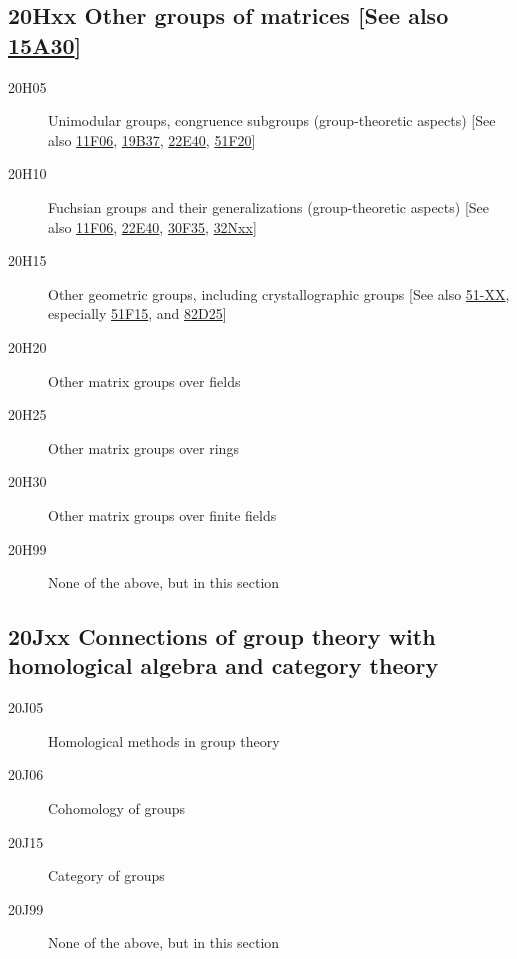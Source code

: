 \documentclass[letterpaper]{article}
\begin{document}
\subsection*{20Hxx  Other groups of matrices [See also \hyperref[15A30]{15A30}] }\label{20Hxx}
\begin{description}  
\item [20H05]\label{20H05} Unimodular groups, congruence subgroups (group-theoretic aspects) [See also \hyperref[11F06]{11F06}, \hyperref[19B37]{19B37}, \hyperref[22E40]{22E40}, \hyperref[51F20]{51F20}]
\item [20H10]\label{20H10} Fuchsian groups and their generalizations (group-theoretic aspects) [See also \hyperref[11F06]{11F06}, \hyperref[22E40]{22E40}, \hyperref[30F35]{30F35}, \hyperref[32Nxx]{32Nxx}]
\item [20H15]\label{20H15} Other geometric groups, including crystallographic groups [See also \hyperref[51-XX]{51-XX}, especially  \hyperref[51F15]{51F15}, and \hyperref[82D25]{82D25}]
\item [20H20]\label{20H20} Other matrix groups over fields
\item [20H25]\label{20H25} Other matrix groups over rings
\item [20H30]\label{20H30} Other matrix groups over finite fields
\item [20H99]\label{20H99} None of the above, but in this section
\end{description}
\subsection*{20Jxx  Connections of group theory with homological algebra and category theory }\label{20Jxx}
\begin{description}  
\item [20J05]\label{20J05} Homological methods in group theory
\item [20J06]\label{20J06} Cohomology of groups
\item [20J15]\label{20J15} Category of groups
\item [20J99]\label{20J99} None of the above, but in this section
\end{description}
\end{document}
